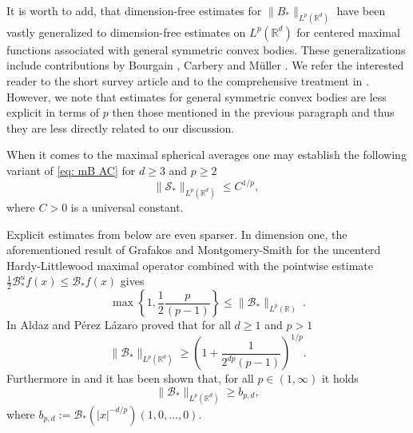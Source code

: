 \documentclass[a4paper, reqno]{amsart}
\theoremstyle{definition}
\newcommand{\R}{{\mathbb R}}
\newcommand{\mB}{\mathcal{B}}
\newcommand{\mS}{\mathcal{S}}
\begin{document}
It is worth to add, that dimension-free estimates for $\|B_*\|_{L^p(\R^d)}$ have been vastly generalized to dimension-free estimates on $L^p(\R^d)$ for centered maximal functions associated with general symmetric convex bodies. These generalizations include contributions by Bourgain \cite{Bo1}, Carbery \cite{Car1} and M\"uller \cite{Mul1}. We refer the interested reader to the short survey article \cite{BMSW21} and to the comprehensive treatment in \cite{DGM18}. However, we note that estimates for general symmetric convex bodies are less explicit in terms of $p$ then those mentioned in the previous paragraph and thus they are less directly related to our discussion.

When it comes to the maximal spherical averages one may establish the following variant of \eqref{eq: mB AC} for $d\ge 3$ and $p\ge 2$
\begin{equation*}
\|\mS_*\|_{L^p(\R^d)}\leq C^{1/p},~
\end{equation*}
where $C>0$ is a universal constant.

Explicit estimates from below are even sparser.
In dimension one, the aforementioned result of Grafakos and Montgomery-Smith \cite{GM-S1} for the uncenterd Hardy-Littlewood maximal operator combined with the pointwise estimate $\frac{1}{2}\mB_\ast^uf(x)\leq \mB_\ast f(x)$ gives
$$\max \left\lbrace 1, \frac{1}{2}\frac{p}{(p-1)}\right\rbrace \leq \|\mB_\ast\|_{L^p(\mathbb{R})}~.$$
In \cite[Remark 2.9]{APL} Aldaz and P\'erez L\'azaro proved that for all $d\geq 1$ and $p>1$
\begin{equation}
\label{eq: mB bel APL}
\|\mB_{*}\|_{L^p(\R^d)}\ge \left(1+\frac{1}{2^{dp}(p-1)}\right)^{1/p}.
\end{equation}
Furthermore in \cite[Proposition]{CG1} and \cite[Theorem~3.2]{DSS} it has been shown that, for all $p\in (1,\infty)$ it holds
\begin{equation*}
\|\mB_{*}\|_{L^p(\R^d)}\ge b_{p,d},
\end{equation*}
where $b_{p,d}:=\mB_*(|x|^{-d/p})(1,0,\ldots,0)$.
\end{document}
